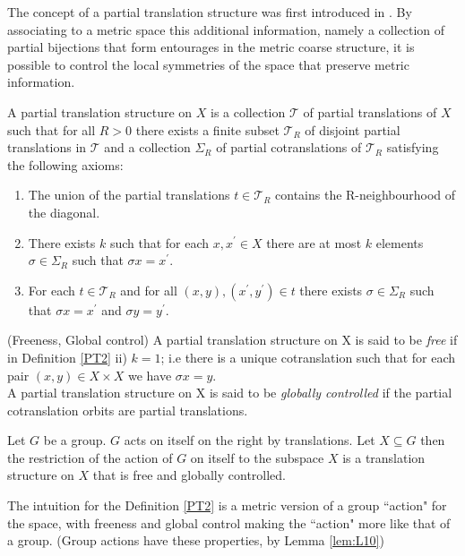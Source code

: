 \begin{corollary}
The concept of a partial translation structure was first introduced in \cite{MR2363428}. By associating to a metric space this additional information, namely a collection of partial bijections that form entourages in the metric coarse structure, it is possible to control the local symmetries of the space that preserve metric information. 


\begin{definition}\label{PT2}
A partial translation structure on $X$ is a collection $\mathcal{T}$ of partial translations of $X$ such that for all $R>0$ there exists a finite subset $\mathcal{T}_{R}$ of disjoint partial translations in $\mathcal{T}$ and a collection $\Sigma_{R}$ of partial cotranslations of $\mathcal{T}_{R}$ satisfying the following axioms:
\begin{enumerate}
\item The union of the partial translations  $t \in \mathcal{T}_{R}$ contains the R-neighbourhood of the diagonal.
\item There exists $k$ such that for each $x,x^{'} \in X$ there are at most $k$ elements $\sigma \in \Sigma_{R}$ such that $\sigma x=x^{'}$.
\item For each $t \in \mathcal{T}_{R}$ and for all $(x,y),(x^{'},y^{'}) \in t$ there exists $\sigma \in \Sigma_{R}$ such that $\sigma x=x^{'}$ and $\sigma y=y^{'}$.
\end{enumerate}
\end{definition}

\begin{definition}(Freeness, Global control)
A partial translation structure on X is said to be \textit{free} if in Definition \ref{PT2} ii) $k=1$; i.e there is a unique cotranslation such that for each pair $(x,y)\in X \times X$ we have $\sigma x = y$.\\
A partial translation structure on X is said to be \textit{globally controlled} if the partial cotranslation orbits are partial translations. 
\end{definition}

\begin{lemma}\label{lem:L10}
Let $G$ be a group. $G$ acts on itself on the right by translations. Let $X \subseteq G$ then the restriction of the action of $G$ on itself to the subspace $X$ is a translation structure on $X$ that is free and globally controlled.
\end{lemma}

The intuition for the Definition \ref{PT2} is a metric version of a group ``action" for the space, with freeness and global control making the ``action" more like that of a group. (Group actions have these properties, by Lemma \ref{lem:L10})


\end{corollary}
